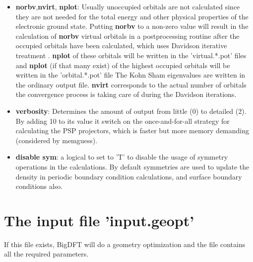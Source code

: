 \documentclass[a4paper,11pt]{report}
\begin{document}
\begin{itemize}
\item {\bf norbv},{\bf nvirt}, {\bf  nplot}: Usually unoccupied orbitals are not calculated since they are not needed for 
      the total energy and other physical properties of the electronic ground state. 
      Putting  {\bf norbv} to  a non-zero 
      value will result in the calculation of {\bf norbv} virtual orbitals in a postprocessing 
      routine after the occupied orbitals have been calculated, which uses Davidson iterative treatment . {\bf nplot}  of these 
      orbitals will be written in the 'virtual.*.pot' files and {\bf nplot} (if that many exist) 
      of the highest occupied orbitals will be  written in the 'orbital.*.pot' file
      The Kohn Sham eigenvalues are written in the ordinary output file.  {\bf nvirt} corresponds to the actual number of orbitals the convergence process is taking care of during the Davidson iterations.

\item {\bf verbosity}: Determines the amount of output from little (0)
      to detailed (2). By adding 10 to its value it switch on the
      once-and-for-all strategy for calculating the PSP projectors, which
      is faster but more memory demanding (considered by memguess).
\item \textbf{disable sym}: a logical to set to 'T' to disable the
      usage of symmetry operations in the calculations. By default symmetries
      are used to update the density in periodic boundary condition
      calculations, and surface boundary conditions also.
\end{itemize}

\section{The input file 'input.geopt'}
If this file exists, BigDFT will do a geometry optimization and the file contains all the required parameters.
\end{document}
